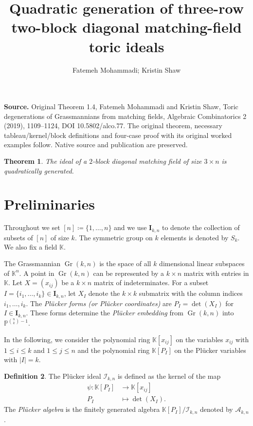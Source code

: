 \documentclass[10pt]{amsart}
\title[Quadratic two-block matching-field ideals]{Quadratic generation of three-row two-block diagonal matching-field toric ideals}
\author{Fatemeh Mohammadi; Kristin Shaw}
\date{}
\newtheorem{theo}{Theorem}[section]
\theoremstyle{definition}
\newtheorem{Definition}[theo]{Definition}
\DeclareMathOperator{\Gr}{Gr}
\newcommand{\I}{\mathcal{I}}
\begin{document}
\maketitle
\noindent\textbf{Source.} Original Theorem 1.4, Fatemeh Mohammadi and Kristin Shaw, Toric degenerations of Grassmannians from matching fields, Algebraic Combinatorics 2 (2019), 1109--1124, DOI 10.5802/alco.77. The original theorem, necessary tableau/kernel/block definitions and four-case proof with its original worked examples follow. Native source and publication are preserved.
\setcounter{section}{1}
\setcounter{theo}{3}
\begin{theo}\label{Theorem:2block}
The ideal of a $2$-block diagonal matching field of size $3 \times n$ is quadratically generated. 
\end{theo}
\section{Preliminaries}\label{prelim} 

Throughout we set $[n]\coloneqq \{1, \ldots , n\}$ and we use $\mathbf{I}_{k, n}$ to denote the collection of subsets of $[n]$ of size $k$. The symmetric group on $k$ elements is denoted by $S_k$. We also fix a field $\mathbb{K}$. 

\smallskip

The Grassmannian $\Gr(k, n)$ is the space of all $k$ dimensional linear subspaces of $\mathbb{K}^n$. A point in $\Gr(k, n)$ can be represented by a $k\times n$ matrix with entries in $\mathbb{K}$. 
Let $X=(x_{ij})$ be a $k\times n$ matrix of indeterminates. For a subset $I = \{i_1,\ldots,i_k\} \in \mathbf{I}_{k, n}$, let $X_I$ denote the $k\times k$ submatrix with the column indices $i_1,\ldots,i_k$. 
The \emph{Pl{\"u}cker forms (or Pl{\"u}cker coordinates)} are $P_I = \det (X_I)$ for $I \in\mathbf{I}_{k, n}$. These forms determine the \emph{Pl{\"u}cker embedding} from
$ \Gr (k,n)$ into $\mathbb{P}^{\binom{n}{k}-1}$. 

In the following, we consider the polynomial ring $\mathbb{K}[x_{ij}]$ on the variables $x_{ij}$ with $1\leq i\leq k$ and $1\leq j\leq n$ and the polynomial ring $\mathbb{K}[P_I]$ on the Pl{\"u}cker variables with $|I|=k$.

\begin{Definition}\label{def:ideal}The Pl{\"u}cker ideal $\I_{k,n}$ is defined as the kernel of the map 
\begin{equation}\label{eqn:pluckermap}
\begin{aligned} 
\psi \colon \mathbb{K}[P_I] &\rightarrow \mathbb{K}[x_{ij}] 
\\ 
 P_{I} &\mapsto \det (X_I).
\end{aligned}
\end{equation}
The \emph{Pl{\"u}cker algebra} is the finitely generated algebra $\mathbb{K}[P_I ]/{\mathcal{I}_{k,n}}$ 
denoted by $\mathcal{A}_{k,n}$.
\end{Definition}
\end{document}
